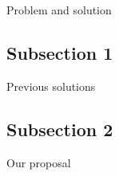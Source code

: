 Problem and solution

\subsection{Subsection 1}
Previous solutions

\subsection{Subsection 2}
Our proposal